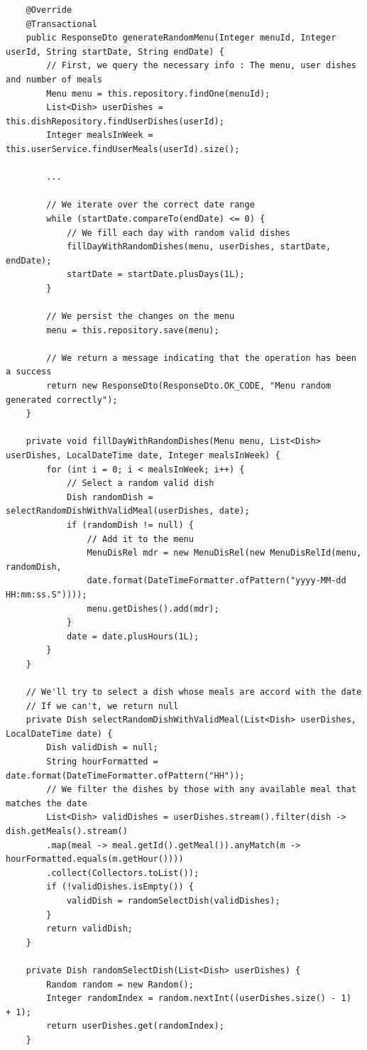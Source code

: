 \documentclass[12pt, a4paper, twoside]{book}
\begin{document}
	\begin{lstlisting}
	@Override
	@Transactional
	public ResponseDto generateRandomMenu(Integer menuId, Integer userId, String startDate, String endDate) {
		// First, we query the necessary info : The menu, user dishes and number of meals
		Menu menu = this.repository.findOne(menuId);	
		List<Dish> userDishes = this.dishRepository.findUserDishes(userId);
		Integer mealsInWeek = this.userService.findUserMeals(userId).size();
		
		...
		
		// We iterate over the correct date range
		while (startDate.compareTo(endDate) <= 0) {
			// We fill each day with random valid dishes
			fillDayWithRandomDishes(menu, userDishes, startDate, endDate);
			startDate = startDate.plusDays(1L);
		}	
		
		// We persist the changes on the menu
		menu = this.repository.save(menu);
		
		// We return a message indicating that the operation has been a success
		return new ResponseDto(ResponseDto.OK_CODE, "Menu random generated correctly");
	}
	
	private void fillDayWithRandomDishes(Menu menu, List<Dish> userDishes, LocalDateTime date, Integer mealsInWeek) {
		for (int i = 0; i < mealsInWeek; i++) {
			// Select a random valid dish
			Dish randomDish = selectRandomDishWithValidMeal(userDishes, date);
			if (randomDish != null) {
				// Add it to the menu
				MenuDisRel mdr = new MenuDisRel(new MenuDisRelId(menu, randomDish,
				date.format(DateTimeFormatter.ofPattern("yyyy-MM-dd HH:mm:ss.S"))));
				menu.getDishes().add(mdr);
			}
			date = date.plusHours(1L);
		}
	}
	
	// We'll try to select a dish whose meals are accord with the date
	// If we can't, we return null
	private Dish selectRandomDishWithValidMeal(List<Dish> userDishes, LocalDateTime date) {
		Dish validDish = null;
		String hourFormatted = date.format(DateTimeFormatter.ofPattern("HH"));
		// We filter the dishes by those with any available meal that matches the date
		List<Dish> validDishes = userDishes.stream().filter(dish -> dish.getMeals().stream()
		.map(meal -> meal.getId().getMeal()).anyMatch(m -> hourFormatted.equals(m.getHour())))
		.collect(Collectors.toList());
		if (!validDishes.isEmpty()) {
			validDish = randomSelectDish(validDishes);
		}
		return validDish;
	}
	
	private Dish randomSelectDish(List<Dish> userDishes) {
		Random random = new Random();
		Integer randomIndex = random.nextInt((userDishes.size() - 1)  + 1);
		return userDishes.get(randomIndex);
	}
	\end{lstlisting}
	
\end{document}
